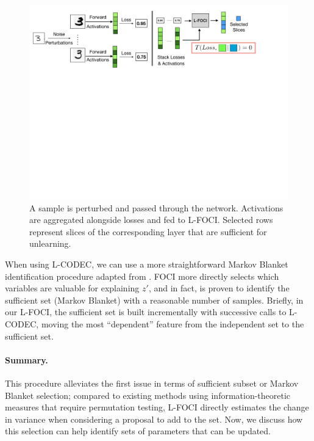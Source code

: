 \begin{figure}
    \centering
    \includegraphics[width=\columnwidth,trim={0 18cm 4cm 0},clip]{5_unlearn/figs/foci_fig_new.png}
    \caption{A sample is perturbed and passed through the network. Activations are aggregated alongside losses and fed to L-FOCI. Selected rows represent slices of the corresponding layer that are sufficient for unlearning.}
    \label{fig:lfoci}
\end{figure}

When using L-CODEC, we can use a more straightforward Markov Blanket identification procedure adapted from \cite{codec}. FOCI more directly selects which variables are valuable for explaining $z'$, and in fact, is proven to identify the sufficient set (Markov Blanket) with a reasonable number of samples. Briefly, in our L-FOCI, the sufficient set is built incrementally with successive calls to L-CODEC, moving the most ``dependent'' feature from the independent set to the sufficient set.

\paragraph{Summary.} This procedure alleviates the first issue in terms of sufficient subset or Markov Blanket selection; compared to existing methods using information-theoretic measures that require permutation testing, L-FOCI directly estimates the change in variance when considering a proposal to add to the set.
Now, we discuss how this selection can help identify sets of parameters that can be updated.
